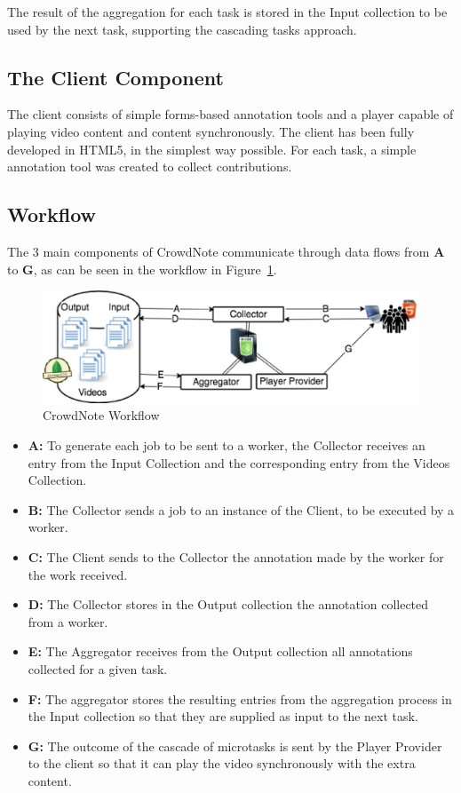 The result of the aggregation for each task is stored in the Input collection to be used by the next task, supporting the cascading tasks approach.

\subsection{The Client Component}
The client consists of simple forms-based annotation tools and a player capable of playing video content and content synchronously. The client has been fully developed in HTML5, in the simplest way possible. For each task, a simple annotation tool was created to collect contributions.



\subsection{Workflow}
The 3 main components of CrowdNote communicate through data flows from \textbf{A} to \textbf{G}, as can be seen in the workflow in Figure~\ref{workflow}.

\begin{figure}[h]
	\centerline{\includegraphics[scale=0.36] {figure/Workflow}}
	\caption{CrowdNote Workflow}
	\label{workflow}
\end{figure}

\begin{itemize}
\item \textbf{A:} To generate each job to be sent to a worker, the Collector receives an entry from the Input Collection and the corresponding entry from the Videos Collection.

\item \textbf{B:} The Collector sends a job to an instance of the Client, to be executed by a worker.

\item \textbf{C:} The Client sends to the Collector the annotation made by the worker for the work received.

\item \textbf{D:} The Collector stores in the Output collection the annotation collected from a worker.

\item \textbf{E:} The Aggregator receives from the Output collection all annotations collected for a given task.

\item \textbf{F:} The aggregator stores the resulting entries from the aggregation process in the Input collection so that they are supplied as input to the next task.

\item \textbf{G:} The outcome of the cascade of microtasks is sent by the Player Provider to the client so that it can play the video synchronously with the extra content.
\end{itemize}
